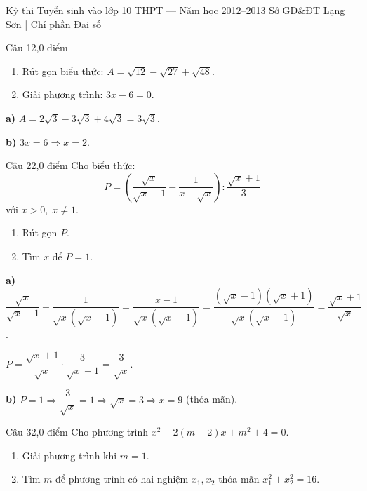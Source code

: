 ﻿%
%
  {Kỳ thi Tuyển sinh vào lớp 10 THPT — Năm học 2012--2013}%
  {Sở GD\&ĐT Lạng Sơn | Chỉ phần Đại số}

\begin{de_cau}{Câu 1}{2,0 điểm}
\begin{enumerate}[label=\alph*)]
  \item Rút gọn biểu thức: $A = \sqrt{12} - \sqrt{27} + \sqrt{48}$.
  \item Giải phương trình: $3x - 6 = 0$.
\end{enumerate}
\end{de_cau}

\begin{loi_giai_cau}
\textbf{a)} $A = 2\sqrt{3} - 3\sqrt{3} + 4\sqrt{3} = \boxed{3\sqrt{3}}$.

\textbf{b)} $3x=6\Rightarrow\boxed{x=2}$.
\end{loi_giai_cau}

\begin{de_cau}{Câu 2}{2,0 điểm}
Cho biểu thức:
\[P = \left(\dfrac{\sqrt{x}}{\sqrt{x}-1} - \dfrac{1}{x-\sqrt{x}}\right) : \dfrac{\sqrt{x}+1}{3}\]
với $x > 0,\; x \neq 1$.
\begin{enumerate}[label=\alph*)]
  \item Rút gọn $P$.
  \item Tìm $x$ để $P = 1$.
\end{enumerate}
\end{de_cau}

\begin{loi_giai_cau}
\textbf{a)} $\dfrac{\sqrt{x}}{\sqrt{x}-1}-\dfrac{1}{\sqrt{x}(\sqrt{x}-1)}=\dfrac{x-1}{\sqrt{x}(\sqrt{x}-1)}=\dfrac{(\sqrt{x}-1)(\sqrt{x}+1)}{\sqrt{x}(\sqrt{x}-1)}=\dfrac{\sqrt{x}+1}{\sqrt{x}}$.

$P=\dfrac{\sqrt{x}+1}{\sqrt{x}}\cdot\dfrac{3}{\sqrt{x}+1}=\boxed{\dfrac{3}{\sqrt{x}}}$.

\textbf{b)} $P=1\Rightarrow\dfrac{3}{\sqrt{x}}=1\Rightarrow\sqrt{x}=3\Rightarrow\boxed{x=9}$ (thỏa mãn).
\end{loi_giai_cau}

\begin{de_cau}{Câu 3}{2,0 điểm}
Cho phương trình $x^2 - 2(m+2)x + m^2 + 4 = 0$.
\begin{enumerate}[label=\alph*)]
  \item Giải phương trình khi $m = 1$.
  \item Tìm $m$ để phương trình có hai nghiệm $x_1, x_2$ thỏa mãn $x_1^2 + x_2^2 = 16$.
\end{enumerate}
\end{de_cau}

